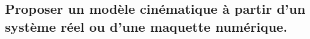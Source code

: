 \documentclass[10pt,fleqn]{article}
\newcommand{\repRel}{../..}
\newcommand{\repStyle}{\repRel/Style}
\newcommand{\td}{fichier_td}
\newcommand{\repExos}{\repRel/ExercicesCompetences}
\newcommand{\repExo}{dossier}
\begin{document}
\begin{multicols}{2} 

\end{multicols}

\subsection{Proposer un modèle cinématique à partir d'un système réel ou d'une maquette numérique.} 

\begin{multicols}{2} 

\renewcommand{\repExo}{\repExos/B2_ProposerModele/B2_12_ModeliserSchemasCinematiques/01_T}
\renewcommand{\td}{01_T}
\graphicspath{{\repStyle/png/}{\repExo/images/}}


\renewcommand{\repExo}{\repExos/B2_ProposerModele/B2_12_ModeliserSchemasCinematiques/02_R}
\renewcommand{\td}{02_R}
\graphicspath{{\repStyle/png/}{\repExo/images/}}


\renewcommand{\repExo}{\repExos/B2_ProposerModele/B2_12_ModeliserSchemasCinematiques/03_TT}
\renewcommand{\td}{03_TT}
\graphicspath{{\repStyle/png/}{\repExo/images/}}


\renewcommand{\repExo}{\repExos/B2_ProposerModele/B2_12_ModeliserSchemasCinematiques/04_RR}
\renewcommand{\td}{04_RR}
\graphicspath{{\repStyle/png/}{\repExo/images/}}


\renewcommand{\repExo}{\repExos/B2_ProposerModele/B2_12_ModeliserSchemasCinematiques/05_RT}
\renewcommand{\td}{05_RT}
\graphicspath{{\repStyle/png/}{\repExo/images/}}


\renewcommand{\repExo}{\repExos/B2_ProposerModele/B2_12_ModeliserSchemasCinematiques/06_TR}
\renewcommand{\td}{06_TR}
\graphicspath{{\repStyle/png/}{\repExo/images/}}


\renewcommand{\repExo}{\repExos/B2_ProposerModele/B2_12_ModeliserSchemasCinematiques/07_RR3D}
\renewcommand{\td}{07_RR3D}
\graphicspath{{\repStyle/png/}{\repExo/images/}}


\renewcommand{\repExo}{\repExos/B2_ProposerModele/B2_12_ModeliserSchemasCinematiques/08_RR3D}
\renewcommand{\td}{08_RR3D}
\graphicspath{{\repStyle/png/}{\repExo/images/}}


\renewcommand{\repExo}{\repExos/B2_ProposerModele/B2_12_ModeliserSchemasCinematiques/09_RT_RSG}
\renewcommand{\td}{09_RT_RSG}
\graphicspath{{\repStyle/png/}{\repExo/images/}}



\end{multicols}
\end{document}
